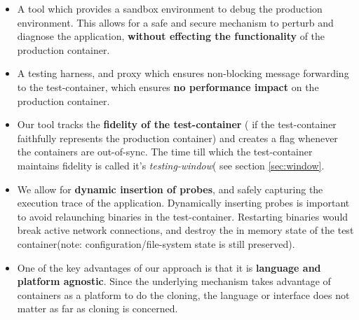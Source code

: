 \begin{itemize}

\item A tool which provides a sandbox environment to debug the production environment. 
This allows for a safe and secure mechanism to perturb and diagnose the application, \textbf{without effecting the functionality} of the  production container.

\item A testing harness, and proxy which ensures non-blocking message forwarding to the test-container, which ensures \textbf{no performance impact} on the production container. 

\item Our tool tracks the \textbf{fidelity of the test-container} ( if the test-container faithfully represents the production container) and creates a flag whenever the containers are out-of-sync. 
The time till which the test-container maintains fidelity is called it's \emph{testing-window}( see section \ref{sec:window}.

\item We allow for \textbf{dynamic insertion of probes}, and safely capturing the execution trace of the application. 
Dynamically inserting probes is important to avoid relaunching binaries in the test-container. 
Restarting binaries would break active network connections, and destroy the in memory state of the test container(note: configuration/file-system state is still preserved).

\item One of the key advantages of our approach is that it is \textbf{language and platform agnostic}. 
Since the underlying mechanism takes advantage of containers as a platform to do the cloning, the language or interface does not matter as far as cloning is concerned. 

\end{itemize}




